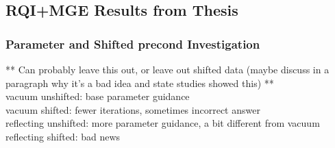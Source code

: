 \documentclass[preprint,12pt]{elsarticle}
\begin{document}


\subsection{RQI+MGE Results from Thesis}
\subsubsection{Parameter and Shifted precond Investigation}
** Can probably leave this out, or leave out shifted data (maybe discuss in a paragraph why it's a bad idea and state studies showed this) **\\
vacuum unshifted: base parameter guidance\\
vacuum shifted: fewer iterations, sometimes incorrect answer\\
reflecting unshifted: more parameter guidance, a bit different from vacuum\\
reflecting shifted: bad news
\end{document}
